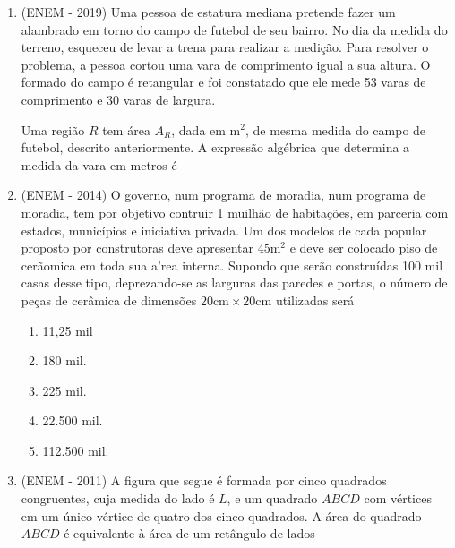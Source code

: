 \begin{enumerate}
  \item (ENEM - 2019) Uma pessoa de estatura mediana pretende fazer um alambrado em torno do campo de futebol de seu bairro. No dia da medida do terreno, esqueceu de levar a trena para realizar a medição. Para resolver o problema, a pessoa cortou uma vara de comprimento igual a sua altura. O formado do campo é retangular e foi constatado que ele mede 53 varas de comprimento e 30 varas de largura.

  Uma região $R$ tem área $A_R$, dada em m$^2$, de mesma medida do campo de futebol, descrito anteriormente. A expressão algébrica que determina a medida da vara em metros é
  \begin{enumerate}
  \end{enumerate}

  \item (ENEM - 2014) O governo, num programa de moradia, num programa de moradia, tem por objetivo contruir 1 muilhão de habitações, em parceria com estados, municípios e iniciativa privada. Um dos modelos de cada popular proposto por construtoras deve apresentar $45$m$^2$ e deve ser colocado piso de cerãomica em toda sua a'rea interna. Supondo que serão construídas 100 mil casas desse tipo, deprezando-se as larguras das paredes e portas, o número de peças de cerâmica de dimensões $20\text{cm}\times20\text{cm}$ utilizadas será
  \begin{enumerate}
    \item 11,25 mil
    \item 180 mil.
    \item 225 mil.
    \item 22.500 mil.
    \item 112.500 mil.
  \end{enumerate}

  \item (ENEM - 2011) A figura que segue é formada por cinco quadrados congruentes, cuja medida do lado é $L$, e um quadrado $ABCD$ com vértices em um único vértice de quatro dos cinco quadrados. A área do quadrado $ABCD$ é equivalente à área de um retângulo de lados


\end{enumerate}
